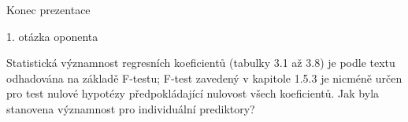 \documentclass[
	11pt, %
]{beamer}
\begin{document}

\begin{frame}[plain] %
	\begin{center}
		{\Huge Konec prezentace}
	\end{center}
\end{frame}


\begin{frame}[plain] %
1. otázka oponenta

Statistická významnost regresních koeficientů (tabulky 3.1 až 3.8) je podle textu odhadována na základě F-testu; F-test zavedený v kapitole 1.5.3 je nicméně určen pro test nulové hypotézy předpokládající nulovost všech koeficientů. Jak byla stanovena významnost pro individuální prediktory?


\end{frame}
\end{document}
